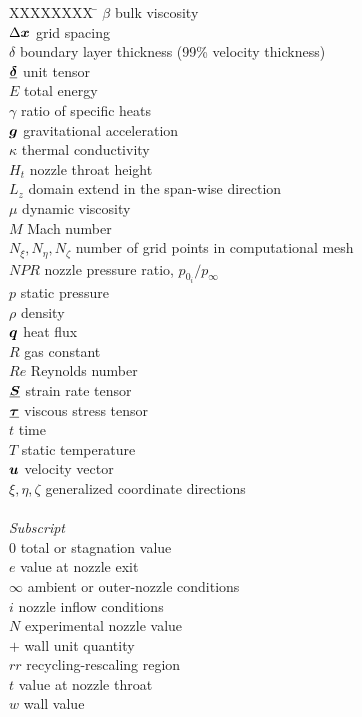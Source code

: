 \documentclass[]{aiaa-tc}%
\def\bgk#1{\mbox{\boldmath $#1$}}
\def\vec#1{\bgk{ #1}}
\def\ten#1{\underline{\bgk{ #1}}}
\begin{document}
\begin{tabbing}
  XXXXXXXX \= \kill%
  $\beta$ \> bulk viscosity \\
  $\Delta\vec{x}$ \> grid spacing \\
  $\delta$  \> boundary layer thickness (99\% velocity thickness) \\
  $\ten{\delta}$ \> unit tensor \\
  $E$ \> total energy \\
  $\gamma$ \> ratio of specific heats \\
  $\vec{g}$ \> gravitational acceleration \\
  $\kappa$ \> thermal conductivity \\
  $H_t$ \> nozzle throat height \\
  $L_z$ \> domain extend in the span-wise direction \\
  $\mu$ \> dynamic viscosity \\
  $M$ \> Mach number \\
  $N_\xi,N_\eta,N_\zeta$ \> number of grid points in computational mesh \\
  $NPR$ \> nozzle pressure ratio, $p_{0_{i}}/p_\infty$ \\
  $p$ \> static pressure \\
  $\rho$ \> density \\
  $\vec{q}$ \> heat flux \\
  $R$ \> gas constant \\
  $Re$ \> Reynolds number \\
  $\ten{S}$ \> strain rate tensor \\
  $\ten{\tau}$ \> viscous stress tensor \\
  $t$ \> time \\
  $T$ \> static temperature \\
  $\vec{u}$ \> velocity vector \\
  $\xi,\eta,\zeta$ \> generalized coordinate directions \\
  \\
  \textit{Subscript}\\
  $0$ \> total or stagnation value \\
  $e$ \> value at nozzle exit \\
  $\infty$ \> ambient or outer-nozzle conditions \\
  $i$ \> nozzle inflow conditions \\
  $N$ \> experimental nozzle value \\
  $+$ \> wall unit quantity \\
  $rr$ \> recycling-rescaling region \\
  $t$ \> value at nozzle throat \\
  $w$ \> wall value \\
 \end{tabbing}
 
\end{document}
